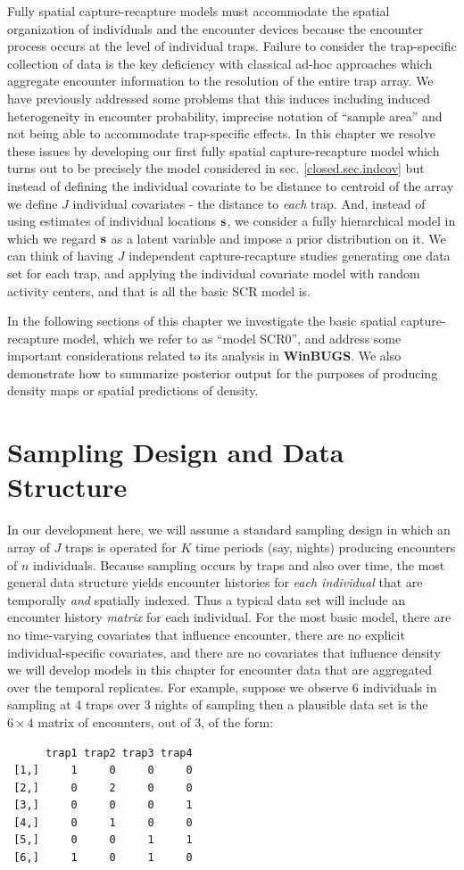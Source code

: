 Fully spatial capture-recapture models must accommodate the spatial
organization of individuals and the encounter devices because the
encounter process occurs at the level of individual traps.  Failure to
consider the trap-specific collection of data is the key deficiency
with classical ad-hoc approaches which aggregate encounter information
to the resolution of the entire trap array. We have  previously
addressed some problems that this induces including induced
heterogeneity in encounter probability, imprecise notation of ``sample
area'' and not being able to accommodate trap-specific
effects.
In this chapter we resolve these issues by developing 
our first fully spatial capture-recapture
model which turns out to be precisely the model considered in sec. \ref{closed.sec.indcov}
 but instead of defining the individual covariate to be distance
to centroid of the array we define $J$ individual covariates - the
distance to {\it each} trap. And, instead of using estimates of
individual locations ${\bf s}$, we consider a fully hierarchical model in
which we regard ${\bf s}$ as a latent variable and impose a prior
distribution on it.  We can think of having $J$ independent
capture-recapture studies generating one data set for each trap, and
applying the individual covariate model with random activity centers,
and that is all the basic SCR model is.

In the following sections of this chapter we investigate the basic
spatial capture-recapture model, which we refer to as ``model SCR0'',  and address some important
considerations related to its analysis in {\bf WinBUGS}. We also demonstrate
how to summarize posterior output for the purposes of producing
density maps or spatial predictions of density.

\section{Sampling Design and Data Structure}

In our development here, we will assume a standard sampling design in
which an array of $J$ traps is operated for $K$ time periods (say,
nights) producing encounters of $n$ individuals.  Because sampling
occurs by traps and also over time, the most general data structure
yields encounter histories for {\it each individual} that are
temporally {\it and} spatially indexed. Thus a typical data set will
include an encounter history {\it matrix} for each individual.  For
the most basic model, there are no time-varying covariates that
influence encounter, there are no explicit individual-specific
covariates, and there are no covariates that influence density we will
develop models in this chapter for encounter data that are aggregated
over the temporal replicates. For example, suppose we observe 6
individuals in sampling at 4 traps over 3 nights of sampling then a
plausible data set is the $6 \times 4$ matrix of encounters, out of 3,
of the form:
\begin{verbatim}
      trap1 trap2 trap3 trap4
 [1,]     1     0     0     0
 [2,]     0     2     0     0
 [3,]     0     0     0     1
 [4,]     0     1     0     0
 [5,]     0     0     1     1
 [6,]     1     0     1     0
\end{verbatim}

